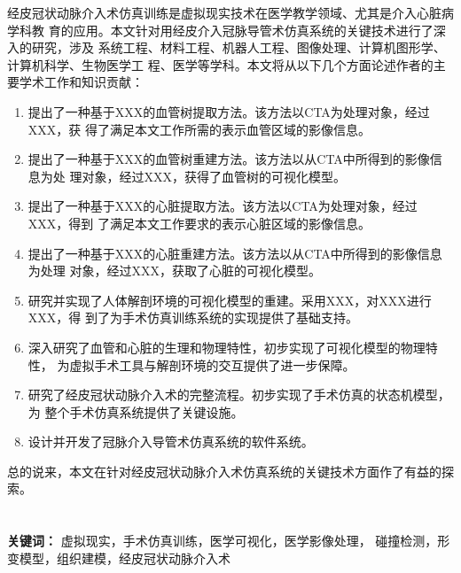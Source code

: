 经皮冠状动脉介入术仿真训练是虚拟现实技术在医学教学领域、尤其是介入心脏病学科教
育的应用。本文针对用经皮介入冠脉导管术仿真系统的关键技术进行了深入的研究，涉及
系统工程、材料工程、机器人工程、图像处理、计算机图形学、计算机科学、生物医学工
程、医学等学科。本文将从以下几个方面论述作者的主要学术工作和知识贡献：
\begin{enumerate}
    \item 提出了一种基于XXX的血管树提取方法。该方法以CTA为处理对象，经过XXX，获
    得了满足本文工作所需的表示血管区域的影像信息。
    \item 提出了一种基于XXX的血管树重建方法。该方法以从CTA中所得到的影像信息为处
    理对象，经过XXX，获得了血管树的可视化模型。
    \item 提出了一种基于XXX的心脏提取方法。该方法以CTA为处理对象，经过XXX，得到
    了满足本文工作要求的表示心脏区域的影像信息。
    \item 提出了一种基于XXX的心脏重建方法。该方法以从CTA中所得到的影像信息为处理
    对象，经过XXX，获取了心脏的可视化模型。
    \item 研究并实现了人体解剖环境的可视化模型的重建。采用XXX，对XXX进行XXX，得
    到了为手术仿真训练系统的实现提供了基础支持。
    \item 深入研究了血管和心脏的生理和物理特性，初步实现了可视化模型的物理特性，
    为虚拟手术工具与解剖环境的交互提供了进一步保障。
    \item 研究了经皮冠状动脉介入术的完整流程。初步实现了手术仿真的状态机模型，为
    整个手术仿真系统提供了关键设施。
    \item 设计并开发了冠脉介入导管术仿真系统的软件系统。
\end{enumerate}
总的说来，本文在针对经皮冠状动脉介入术仿真系统的关键技术方面作了有益的探索。
\\
\\
\\
\noindent \textbf{关键词：} 虚拟现实，手术仿真训练，医学可视化，医学影像处理，
碰撞检测，形变模型，组织建模，经皮冠状动脉介入术
